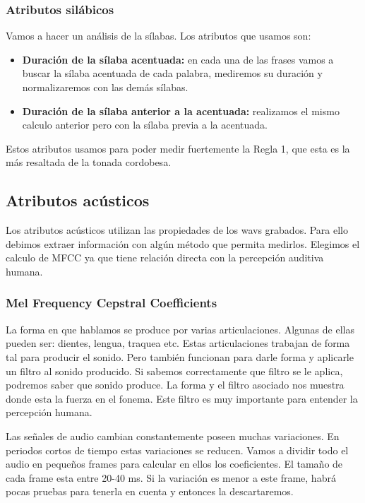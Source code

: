 \documentclass[11pt,a4paper,twoside]{tesis}
\begin{document}
\subsubsection{Atributos silábicos}

Vamos a hacer un análisis de la sílabas. Los atributos que usamos son:

\begin{itemize}
    \item \textbf{Duración de la sílaba acentuada:} en cada una de las frases vamos a buscar la sílaba acentuada de cada palabra, mediremos su duración y normalizaremos con las demás sílabas.
    \item \textbf{Duración de la sílaba anterior a la acentuada:} realizamos el mismo calculo anterior pero con la sílaba previa a la acentuada. 
\end{itemize}

Estos atributos usamos para poder medir fuertemente la Regla 1, que esta es la más resaltada de la tonada cordobesa. 

\subsection{Atributos acústicos}

Los atributos acústicos utilizan las propiedades de los wavs grabados. Para ello debimos extraer información con algún método que permita medirlos. Elegimos el calculo de MFCC ya que tiene relación directa con la percepción auditiva humana. 


\subsubsection{Mel Frequency Cepstral Coefficients}


La forma en que hablamos se produce por varias articulaciones. Algunas de ellas pueden ser: dientes, lengua, traquea etc. Estas articulaciones trabajan de forma tal para producir el sonido. Pero también funcionan para darle forma y aplicarle un filtro al sonido producido. Si sabemos correctamente que filtro se le aplica, podremos saber que sonido produce. La forma y el filtro asociado nos muestra donde esta la fuerza en el fonema. Este filtro es muy importante para entender la percepción humana.

Las señales de audio cambian constantemente poseen muchas variaciones. En periodos cortos de tiempo estas variaciones se reducen. Vamos a dividir todo el audio en pequeños frames para calcular en ellos los coeficientes. El tamaño de cada frame esta entre 20-40 ms. Si la variación es menor a este frame, habrá pocas pruebas para tenerla en cuenta y entonces la descartaremos.
\end{document}
